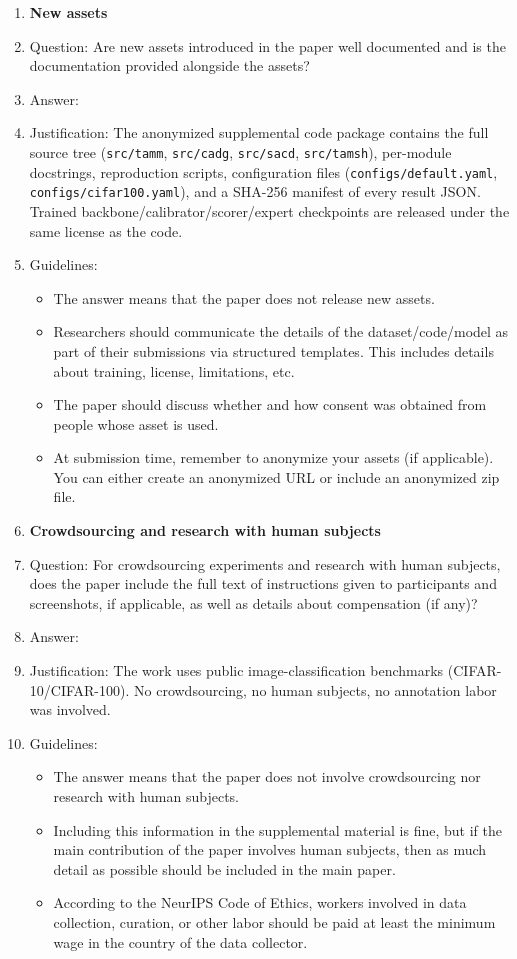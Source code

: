 \begin{enumerate}
\item {\bf New assets}
    \item[] Question: Are new assets introduced in the paper well documented and is the documentation provided alongside the assets?
    \item[] Answer: \answerYes{}
    \item[] Justification: The anonymized supplemental code package contains the full \prism source tree (\texttt{src/tamm}, \texttt{src/cadg}, \texttt{src/sacd}, \texttt{src/tamsh}), per-module docstrings, reproduction scripts, configuration files (\texttt{configs/default.yaml}, \texttt{configs/cifar100.yaml}), and a SHA-256 manifest of every result JSON. Trained backbone/calibrator/scorer/expert checkpoints are released under the same license as the code.
    \item[] Guidelines:
    \begin{itemize}
        \item The answer \answerNA{} means that the paper does not release new assets.
        \item Researchers should communicate the details of the dataset\slash code\slash model as part of their submissions via structured templates. This includes details about training, license, limitations, etc. 
        \item The paper should discuss whether and how consent was obtained from people whose asset is used.
        \item At submission time, remember to anonymize your assets (if applicable). You can either create an anonymized URL or include an anonymized zip file.
    \end{itemize}

\item {\bf Crowdsourcing and research with human subjects}
    \item[] Question: For crowdsourcing experiments and research with human subjects, does the paper include the full text of instructions given to participants and screenshots, if applicable, as well as details about compensation (if any)?
    \item[] Answer: \answerNA{}
    \item[] Justification: The work uses public image-classification benchmarks (CIFAR-10/CIFAR-100). No crowdsourcing, no human subjects, no annotation labor was involved.
    \item[] Guidelines:
    \begin{itemize}
        \item The answer \answerNA{} means that the paper does not involve crowdsourcing nor research with human subjects.
        \item Including this information in the supplemental material is fine, but if the main contribution of the paper involves human subjects, then as much detail as possible should be included in the main paper. 
        \item According to the NeurIPS Code of Ethics, workers involved in data collection, curation, or other labor should be paid at least the minimum wage in the country of the data collector. 
    \end{itemize}


\end{enumerate}
